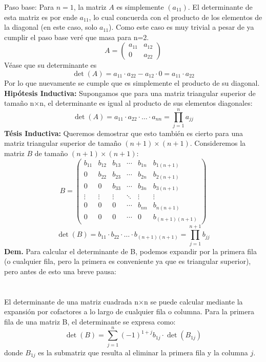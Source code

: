 \begin{solution}
Paso base:
Para \( n = 1 \), la matriz \( A \) es simplemente \( (a_{11}) \). El determinante de esta matriz es por ende \( a_{11} \), lo cual concuerda con el producto de los elementos de la diagonal (en este caso, solo \( a_{11} \)). Como este caso es muy trivial a pesar de ya cumplir el paso base veré que masa para n=2.
\[
A = \begin{pmatrix} 
a_{11} & a_{12} \\
0 & a_{22} 
\end{pmatrix}
\]
Véase que su determinante es
\[
\operatorname{det}(A) = a_{11} \cdot a_{22} - a_{12} \cdot 0 = a_{11} \cdot a_{22}
\]
Por lo que nuevamente se cumple que es simplemente el producto de su diagonal.\\
\textbf{Hipótesis Inductiva:}
Supongamos que para una matriz triangular superior de tamaño n×n, el determinante es igual al producto de sus elementos diagonales:
\[
\operatorname{det}(A) = a_{11} \cdot a_{22} \cdot \ldots \cdot a_{nn} = \prod_{j=1}^{n} a_{jj}
\]
\textbf{Tésis Inductiva:}
Queremos demostrar que esto también es cierto para una matriz triangular superior de tamaño \((n+1) \times (n+1)\).
Consideremos la matriz \( B \) de tamaño \((n+1) \times (n+1)\):
\[
B = \left(\begin{array}{cccccc}
b_{11} & b_{12} & b_{13} & \cdots & b_{1n} & b_{1(n+1)} \\
0 & b_{22} & b_{23} & \cdots & b_{2n} & b_{2(n+1)} \\
0 & 0 & b_{33} & \cdots & b_{3n} & b_{3(n+1)} \\
\vdots & \vdots & \vdots & \ddots & \vdots & \vdots \\
0 & 0 & 0 & \cdots & b_{nn} & b_{n(n+1)} \\
0 & 0 & 0 & \cdots & 0 & b_{(n+1)(n+1)}
\end{array}\right)
\]
\[
\operatorname{det}(B) = b_{11} \cdot b_{22} \cdot \ldots \cdot b_{(n+1)(n+1)} = \prod_{j=1}^{n+1} b_{jj}
\]
\textbf{Dem.} Para calcular el determinante de B, podemos expandir por la primera fila (o cualquier fila, pero la primera es conveniente ya que es triangular superior), pero antes de esto una breve pausa: \\
\hline
\textit{ }\\
\shortparallel\\

El determinante de una matriz cuadrada n×n se puede calcular mediante la expansión por cofactores a lo largo de cualquier fila o columna. Para la primera fila de una matriz B, el determinante se expresa como:
\[
   \operatorname{det}(B) = \sum_{j=1}^{n} (-1)^{1+j} b_{1j} \cdot \operatorname{det}(B_{1j})
   \]
donde \( B_{1j} \) es la submatriz que resulta al eliminar la primera fila y la columna \( j \).


\end{solution}
